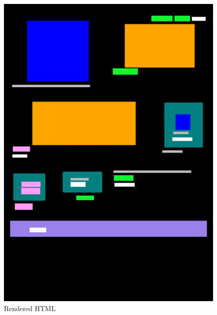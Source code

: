 \begin{figure}[H]
    \centering
    \begin{minipage}{0.35\textwidth}
        \centering
        \includegraphics[width=\linewidth]{images/sample1-rendered.png}
        \caption{Rendered HTML}        
        \label{fig:s1}
    \end{minipage}\hfill
    \begin{minipage}{0.35\textwidth}
        \centering

\end{minipage}
\end{figure}
